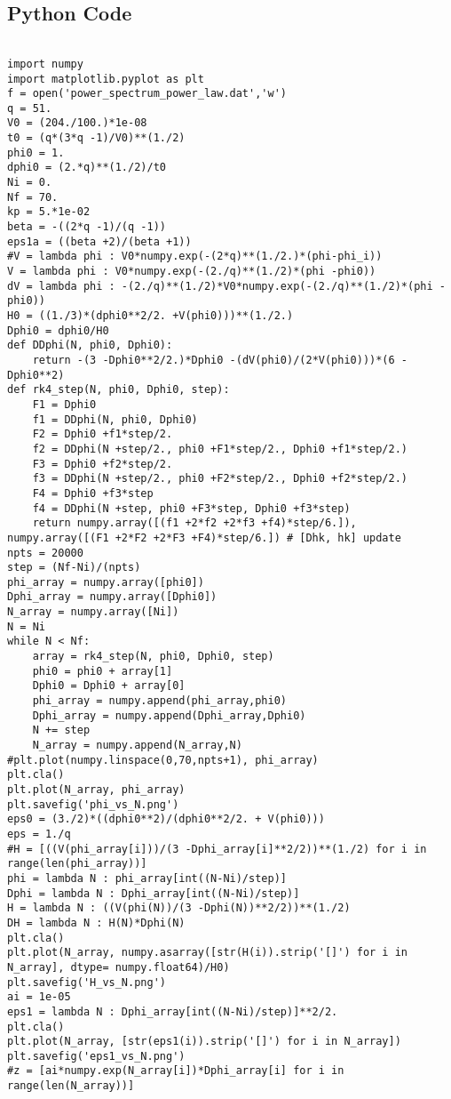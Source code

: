 \documentclass[12pt,a4paper,oneside]{book}
\begin{document}
\begin{appendices}
\chapter{Python Code}
\begin{verbatim}

import numpy
import matplotlib.pyplot as plt
f = open('power_spectrum_power_law.dat','w')
q = 51.
V0 = (204./100.)*1e-08
t0 = (q*(3*q -1)/V0)**(1./2)
phi0 = 1.
dphi0 = (2.*q)**(1./2)/t0
Ni = 0.
Nf = 70. 
kp = 5.*1e-02
beta = -((2*q -1)/(q -1))
eps1a = ((beta +2)/(beta +1))
#V = lambda phi : V0*numpy.exp(-(2*q)**(1./2.)*(phi-phi_i))
V = lambda phi : V0*numpy.exp(-(2./q)**(1./2)*(phi -phi0))
dV = lambda phi : -(2./q)**(1./2)*V0*numpy.exp(-(2./q)**(1./2)*(phi -phi0))
H0 = ((1./3)*(dphi0**2/2. +V(phi0)))**(1./2.)
Dphi0 = dphi0/H0
def DDphi(N, phi0, Dphi0):
    return -(3 -Dphi0**2/2.)*Dphi0 -(dV(phi0)/(2*V(phi0)))*(6 -Dphi0**2)
def rk4_step(N, phi0, Dphi0, step):
    F1 = Dphi0
    f1 = DDphi(N, phi0, Dphi0)
    F2 = Dphi0 +f1*step/2.
    f2 = DDphi(N +step/2., phi0 +F1*step/2., Dphi0 +f1*step/2.)
    F3 = Dphi0 +f2*step/2.
    f3 = DDphi(N +step/2., phi0 +F2*step/2., Dphi0 +f2*step/2.)
    F4 = Dphi0 +f3*step
    f4 = DDphi(N +step, phi0 +F3*step, Dphi0 +f3*step)  
    return numpy.array([(f1 +2*f2 +2*f3 +f4)*step/6.]), numpy.array([(F1 +2*F2 +2*F3 +F4)*step/6.]) # [Dhk, hk] update
npts = 20000
step = (Nf-Ni)/(npts)
phi_array = numpy.array([phi0])
Dphi_array = numpy.array([Dphi0])
N_array = numpy.array([Ni]) 
N = Ni
while N < Nf:
    array = rk4_step(N, phi0, Dphi0, step)
    phi0 = phi0 + array[1]
    Dphi0 = Dphi0 + array[0]
    phi_array = numpy.append(phi_array,phi0)
    Dphi_array = numpy.append(Dphi_array,Dphi0)
    N += step
    N_array = numpy.append(N_array,N)
#plt.plot(numpy.linspace(0,70,npts+1), phi_array)
plt.cla()
plt.plot(N_array, phi_array)
plt.savefig('phi_vs_N.png')
eps0 = (3./2)*((dphi0**2)/(dphi0**2/2. + V(phi0)))
eps = 1./q 
#H = [((V(phi_array[i]))/(3 -Dphi_array[i]**2/2))**(1./2) for i in range(len(phi_array))]
phi = lambda N : phi_array[int((N-Ni)/step)]
Dphi = lambda N : Dphi_array[int((N-Ni)/step)]
H = lambda N : ((V(phi(N))/(3 -Dphi(N))**2/2))**(1./2)
DH = lambda N : H(N)*Dphi(N)
plt.cla()
plt.plot(N_array, numpy.asarray([str(H(i)).strip('[]') for i in N_array], dtype= numpy.float64)/H0)
plt.savefig('H_vs_N.png')
ai = 1e-05
eps1 = lambda N : Dphi_array[int((N-Ni)/step)]**2/2.
plt.cla()
plt.plot(N_array, [str(eps1(i)).strip('[]') for i in N_array])
plt.savefig('eps1_vs_N.png')
#z = [ai*numpy.exp(N_array[i])*Dphi_array[i] for i in range(len(N_array))]

\end{verbatim}
\end{appendices}
\end{document}
